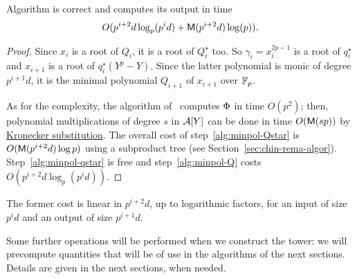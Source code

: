 \begin{theorem}
  Algorithm \hyperref[alg:minimalpolynomial]{}
  is correct and computes its output in time
  \begin{equation}
    O( p^{i+2}d\log_p(p^id)+\mathsf{M}(p^{i+2}d)\log(p))
    \text{.}    
  \end{equation}
\end{theorem}
\begin{proof}
  Since $x_i$ is a root of $Q_i$, it is a root of $Q_i^\star$ too. So
  $\gamma_i=x_i^{2p-1}$ is a root of $q_i^\star$ and $x_{i+1}$ is a
  root of $q_i^\star(Y^p-Y)$. Since the latter polynomial is monic of
  degree $p^{i+1}d$, it is the minimal polynomial $Q_{i+1}$ of
  $x_{i+1}$ over $\mathbb{F}_p$.

  As for the complexity, the algorithm of~\cite{brent93} computes
  $\Phi$ in time $O(p^2)$; then, polynomial multiplications of
  degree $s$ in $\mathcal{A}[Y]$ can be done in time $O(\mathsf{M}(sp))$ by
  \hyperref[sec:mult-polyn]{Kronecker substitution}. The overall cost
  of step~\ref{alg:minpol-Qstar} is $O(\mathsf{M}(p^{i+2}d)\log p)$ using a
  subproduct tree (see
  Section~\ref{sec:chin-rema-algor}). Step~\ref{alg:minpol-qstar} is
  free and step~\ref{alg:minpol-Q} costs $O(p^{i+2}d\log_p(p^id))$.
\end{proof}

The former cost is linear in $p^{i+2}d$, up to logarithmic factors,
for an input of size $p^id$ and an output of size $p^{i+1}d$.

Some further operations will be performed when we construct the tower:
we will precompute quantities that will be of use in the algorithms of
the next sections. Details are given in the next sections, when
needed.


%
